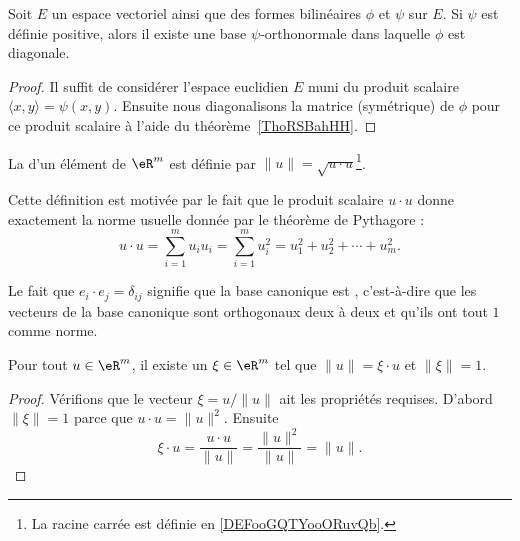 \begin{corollary}   \label{CorSMHpoVK}
	Soit \( E\) un espace vectoriel ainsi que des formes bilinéaires \( \phi\) et \( \psi\) sur \( E\). Si \( \psi\) est définie positive, alors il existe une base \( \psi\)-orthonormale dans laquelle \( \phi\) est diagonale.
\end{corollary}

\begin{proof}
	Il suffit de considérer l'espace euclidien \( E\) muni du produit scalaire \( \langle x, y\rangle =\psi(x,y)\). Ensuite nous diagonalisons la matrice (symétrique) de \( \phi\) pour ce produit scalaire à l'aide du théorème~\ref{ThoRSBahHH}.
\end{proof}

\begin{definition}      \label{DefNormeEucleApp}
	La  d'un élément de \( \eR^m\) est définie par \( \| u \|=\sqrt{u\cdot u}\)\footnote{La racine carrée est définie en \ref{DEFooGQTYooORuvQb}.}.
\end{definition}

Cette définition est motivée par le fait que le produit scalaire \( u\cdot u\) donne exactement la norme usuelle donnée par le théorème de Pythagore :
\begin{equation}
	u\cdot u=\sum_{i=1}^mu_iu_i=\sum_{i=1}^m u_i^2=u_1^2+u_2^2+\cdots+u_m^2.
\end{equation}

Le fait que \( e_i\cdot e_j=\delta_{ij}\) signifie que la base canonique est , c'est-à-dire que les vecteurs de la base canonique sont orthogonaux deux à deux et qu'ils ont tout \( 1\) comme norme.

\begin{lemma}\label{LemSclNormeXi}
	Pour tout \( u\in\eR^m\), il existe un \( \xi\in\eR^m\) tel que \( \| u \|=\xi\cdot u\) et \( \| \xi \|=1\).
\end{lemma}

\begin{proof}
	Vérifions que le vecteur \( \xi=u/\| u \|\) ait les propriétés requises. D'abord \( \| \xi \|=1\) parce que \( u\cdot u=\| u \|^2\). Ensuite
	\begin{equation}
		\xi\cdot u=\frac{ u\cdot u }{ \| u \| }=\frac{ \| u \|^2 }{ \| u \| }=\| u \|.
	\end{equation}
\end{proof}

